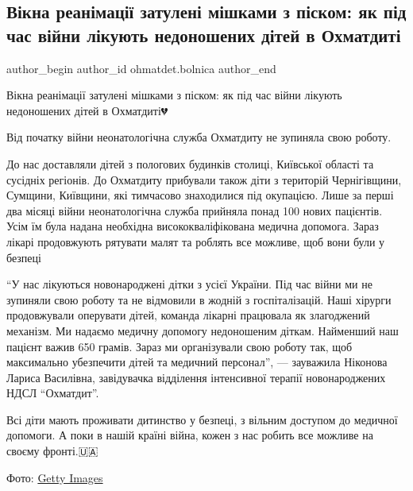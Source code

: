  
 
 
 
 
 
\subsection{Вікна реанімації затулені мішками з піском: як під час війни лікують недоношених дітей в Охматдиті}
\label{sec:08_12_2022.fb.ohmatdet.bolnica.1.reanimacia_pisok_dity}
 
\ifcmt
 author_begin
   author_id ohmatdet.bolnica
 author_end
\fi

Вікна реанімації затулені мішками з піском: як під час війни лікують
недоношених дітей в Охматдиті💔

Від початку війни неонатологічна служба Охматдиту не зупиняла свою роботу. 


До нас доставляли дітей з пологових будинків столиці, Київської області та
сусідніх регіонів. До Охматдиту прибували також діти з територій Чернігівщини,
Сумщини, Київщини, які тимчасово знаходилися під окупацією. Лише за перші два
місяці війни неонатологічна служба прийняла понад 100 нових пацієнтів. Усім їм
була надана необхідна висококваліфікована медична допомога. Зараз лікарі
продовжують рятувати малят та роблять все можливе, щоб вони були у безпеці🙏🏻


\enquote{У нас лікуються новонароджені дітки з усієї України. Під час війни ми не
зупиняли свою роботу та не відмовили в жодній з госпіталізацій. Наші хірурги
продовжували оперувати дітей, команда лікарні працювала як злагоджений
механізм. Ми надаємо медичну допомогу недоношеним діткам. Найменший наш пацієнт
важив 650 грамів. Зараз ми організували свою роботу так, щоб максимально
убезпечити дітей та медичний персонал}, — зауважила Ніконова Лариса Василівна,
завідувачка відділення інтенсивної терапії новонароджених НДСЛ \enquote{Охматдит}. 🙌


Всі діти мають проживати дитинство у безпеці, з вільним доступом до медичної
допомоги. А поки в нашій країні війна, кожен з нас робить все можливе на своєму
фронті.🇺🇦

Фото: \href{https://www.facebook.com/gettyimages/}{Getty Images}

